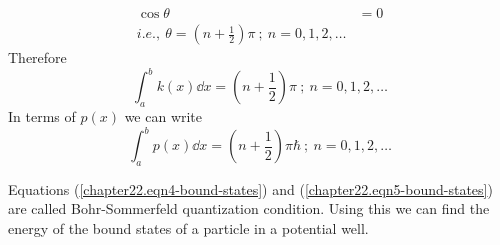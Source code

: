 \begin{align*}
	\cos \theta &= 0 \\
	i.e., \ \theta = (n + \frac{1}{2}) \pi \ ; \ n = 0,1,2,\ldots
\end{align*}
Therefore
\begin{equation}
\label{chapter22.eqn4-bound-states}
	\int_{a}^{b} k(x) \dd{x} = (n + \frac{1}{2}) \pi \ ; \ n = 0,1,2,\ldots
\end{equation}
In terms of $p(x)$ we can write
\begin{equation}
\label{chapter22.eqn5-bound-states}
	\int_{a}^{b} p(x) \dd{x} = (n + \frac{1}{2}) \pi\hbar \ ; \ n = 0,1,2,\ldots
\end{equation}

Equations (\ref{chapter22.eqn4-bound-states}) and (\ref{chapter22.eqn5-bound-states}) are called Bohr-Sommerfeld quantization condition. Using this we can find the energy of the bound states of a particle in a potential well.

